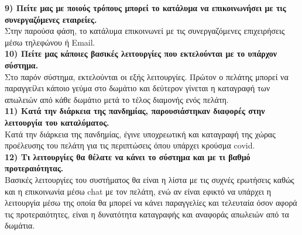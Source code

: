 \noindent
\textbf{9) Πείτε μας με ποιούς τρόπους μπορεί το κατάλυμα να επικοινωνήσει με τις 
	συνεργαζόμενες εταιρείες.} \\
\noindent
Στην παρούσα φάση, το κατάλυμα επικοινωνεί με τις συνεργαζόμενες επιχειρήσεις
μέσω τηλεφώνου ή Email.\\

\noindent
\textbf{10) Πείτε μας κάποιες βασικές λειτουργίες που εκτελούνται με το υπάρχον 
	σύστημα.}\\
Στο παρόν σύστημα, εκτελούνται οι εξής λειτουργίες. Πρώτον ο πελάτης μπορεί να
παραγγείλει κάποιο γεύμα στο δωμάτιο και δεύτερον γίνεται η καταγραφή των 
απωλειών από κάθε δωμάτιο μετά το τέλος διαμονής ενός πελάτη.\\

\noindent
\textbf{11) Κατά την διάρκεια της πανδημίας, παρουσιάστηκαν διαφορές στην
	λειτουργία του καταλύματος.} \\
Κατά την διάρκεια της πανδημίας, έγινε υποχρεωτική και καταγραφή της χώρας
προέλευσης του πελάτη για τις περιπτώσεις όπου υπάρχει κρούσμα covid. \\ 

\noindent
\textbf{12) Τι λειτουργίες θα θέλατε να κάνει το σύστημα και με τι βαθμό 
	προτεραιότητας.} \\
Βασικές λειτουργίες του συστήματος θα είναι η λίστα με τις συχνές ερωτήσεις 
καθώς και η επικοινωνία μέσω chat με τον πελάτη, ενώ αν είναι εφικτό να υπάρχει
η λειτουργία μέσω της οποία θα μπορεί να κάνει παραγγελίες και τελευταία όσον 
αφορά τις προτεραιότητες, είναι η δυνατότητα καταγραφής και αναφοράς απωλειών
από τα δωμάτια. 

\clearpage
